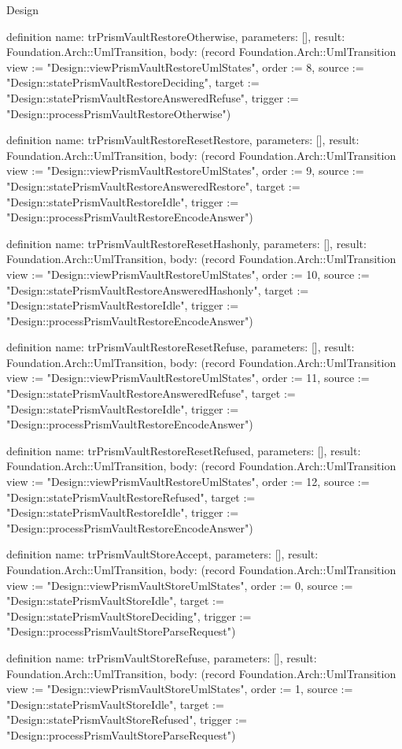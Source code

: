 \begin{lexlean}{Design}
\begin{semanticmodule}
definition{
  name: trPrismVaultRestoreOtherwise,
  parameters: [],
  result: Foundation.Arch::UmlTransition,
  body: (record Foundation.Arch::UmlTransition {view := "Design::viewPrismVaultRestoreUmlStates", order := 8, source := "Design::statePrismVaultRestoreDeciding", target := "Design::statePrismVaultRestoreAnsweredRefuse", trigger := "Design::processPrismVaultRestoreOtherwise"})
}

definition{
  name: trPrismVaultRestoreResetRestore,
  parameters: [],
  result: Foundation.Arch::UmlTransition,
  body: (record Foundation.Arch::UmlTransition {view := "Design::viewPrismVaultRestoreUmlStates", order := 9, source := "Design::statePrismVaultRestoreAnsweredRestore", target := "Design::statePrismVaultRestoreIdle", trigger := "Design::processPrismVaultRestoreEncodeAnswer"})
}

definition{
  name: trPrismVaultRestoreResetHashonly,
  parameters: [],
  result: Foundation.Arch::UmlTransition,
  body: (record Foundation.Arch::UmlTransition {view := "Design::viewPrismVaultRestoreUmlStates", order := 10, source := "Design::statePrismVaultRestoreAnsweredHashonly", target := "Design::statePrismVaultRestoreIdle", trigger := "Design::processPrismVaultRestoreEncodeAnswer"})
}

definition{
  name: trPrismVaultRestoreResetRefuse,
  parameters: [],
  result: Foundation.Arch::UmlTransition,
  body: (record Foundation.Arch::UmlTransition {view := "Design::viewPrismVaultRestoreUmlStates", order := 11, source := "Design::statePrismVaultRestoreAnsweredRefuse", target := "Design::statePrismVaultRestoreIdle", trigger := "Design::processPrismVaultRestoreEncodeAnswer"})
}

definition{
  name: trPrismVaultRestoreResetRefused,
  parameters: [],
  result: Foundation.Arch::UmlTransition,
  body: (record Foundation.Arch::UmlTransition {view := "Design::viewPrismVaultRestoreUmlStates", order := 12, source := "Design::statePrismVaultRestoreRefused", target := "Design::statePrismVaultRestoreIdle", trigger := "Design::processPrismVaultRestoreEncodeAnswer"})
}

definition{
  name: trPrismVaultStoreAccept,
  parameters: [],
  result: Foundation.Arch::UmlTransition,
  body: (record Foundation.Arch::UmlTransition {view := "Design::viewPrismVaultStoreUmlStates", order := 0, source := "Design::statePrismVaultStoreIdle", target := "Design::statePrismVaultStoreDeciding", trigger := "Design::processPrismVaultStoreParseRequest"})
}

definition{
  name: trPrismVaultStoreRefuse,
  parameters: [],
  result: Foundation.Arch::UmlTransition,
  body: (record Foundation.Arch::UmlTransition {view := "Design::viewPrismVaultStoreUmlStates", order := 1, source := "Design::statePrismVaultStoreIdle", target := "Design::statePrismVaultStoreRefused", trigger := "Design::processPrismVaultStoreParseRequest"})
}


\end{semanticmodule}
\end{lexlean}
